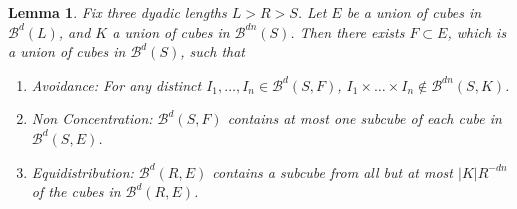 \documentclass[usenames,dvipsnames]{article}
\theoremstyle{plain}
\newtheorem{lemma}{Lemma}
\theoremstyle{plain}
\begin{document}
\begin{lemma}
	Fix three dyadic lengths $L > R > S$. Let $E$ be a union of cubes in $\mathcal{B}^d(L)$, and $K$ a union of cubes in $\mathcal{B}^{dn}(S)$. Then there exists $F \subset E$, which is a union of cubes in $\mathcal{B}^d(S)$, such that
	\begin{enumerate}
		\item[(a)] \emph{Avoidance:}  For any distinct $I_1, \dots, I_n \in \mathcal{B}^d(S,F)$, $I_1 \times \dots \times I_n \not \in \mathcal{B}^{dn}(S,K)$.
		\item[(b)] \emph{Non Concentration:} $\mathcal{B}^d(S,F)$ contains at most one subcube of each cube in $\mathcal{B}^d(S,E)$.
		\item[(c)] \emph{Equidistribution:} $\mathcal{B}^d(R,E)$ contains a subcube from all but at most $|K| R^{-dn}$ of the cubes in $\mathcal{B}^d(R,E)$.
	\end{enumerate}

\end{lemma}
\end{document}
